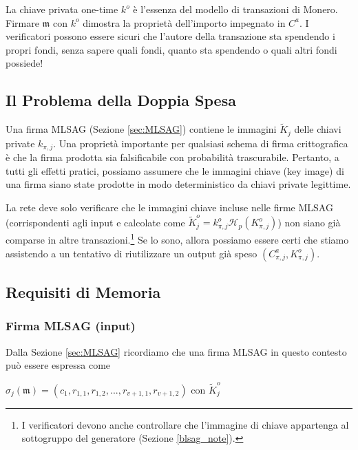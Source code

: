 La chiave privata one-time $k^o$ è l’essenza del modello di transazioni di Monero. Firmare $\mathfrak{m}$ con $k^o$ dimostra la proprietà dell’importo impegnato in $C^a$. I verificatori possono essere sicuri che l’autore della transazione sta spendendo i propri fondi, senza sapere quali fondi, quanto sta spendendo o quali altri fondi possiede!


\subsection{Il Problema della Doppia Spesa}

Una  firma MLSAG (Sezione \ref{sec:MLSAG}) contiene le immagini \(\tilde{K}_{j}\) delle chiavi private \(k_{\pi, j}\). Una proprietà importante per qualsiasi schema di firma crittografica è che la firma prodotta sia falsificabile con probabilità trascurabile. Pertanto, a tutti gli effetti pratici, possiamo assumere che le immagini chiave (key image) di una firma siano state prodotte in modo deterministico da chiavi private legittime.

La rete deve solo verificare che le immagini chiave incluse nelle firme MLSAG (corrispondenti agli input e calcolate come $\tilde{K}^o_{j} = k^o_{\pi,j} \mathcal{H}_p(K^o_{\pi,j})$) non siano già comparse in altre transazioni.\footnote{I verificatori devono anche controllare che l'immagine di chiave appartenga al sottogruppo del generatore (Sezione \ref{blsag_note}).} Se lo sono, allora possiamo essere certi che stiamo assistendo a un tentativo di riutilizzare un output già speso $(C^a_{\pi,j}, K_{\pi,j}^o)$.


\subsection{Requisiti di Memoria}
\label{subsec:space-and-ver-rcttypefull}

\subsubsection*{Firma MLSAG (input)}

Dalla Sezione \ref{sec:MLSAG} ricordiamo che una firma MLSAG in questo contesto può essere espressa come

\hfill \(\sigma_j(\mathfrak{m}) = (c_1, r_{1, 1}, r_{1, 2}, ..., r_{v+1, 1}, r_{v+1, 2}) \textrm{ con } \tilde{K}^o_j \) \hfill \phantom{.}

